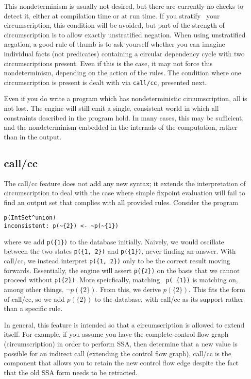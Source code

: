 This nondeterminism is usually not desired, but there are currently no checks to detect it, either at compilation time or at run time.
If you stratify~\cite{prologbook} your circumscription, this condition will be avoided, but part of the strength of circumscription is to allow exactly unstratified negation.
When using unstratified negation, a good rule of thumb is to ask yourself whether you can imagine individual facts (not predicates) containing a circular dependency cycle with two circumscriptions present.
Even if this is the case, it may not force this nondeterminism, depending on the action of the rules.
The condition where one circumscription is present is dealt with via \texttt{call/cc}, presented next.

Even if you do write a program which has nondeterministic circumscription, all is not lost.
The engine will still emit a single, consistent world in which all constraints described in the program hold.
In many cases, this may be sufficient, and the nondeterminism embedded in the internals of the computation, rather than in the output.

\subsection{call/cc}
\label{holmes:sec:callcc}
The call/cc feature does not add any new syntax; it extends the interpretation of circumscription to deal with the case where simple fixpoint evaluation will fail to find an output set that complies with all provided rules.
Consider the program
\begin{verbatim}
p(IntSet^union)
inconsistent: p(~{2}) <- ~p(~{1})
\end{verbatim}
where we add \texttt{p(\{1\})} to the database initially.
Naively, we would oscillate between the two states \texttt{p(\{1, 2\})} and \texttt{p(\{1\})}, never finding an answer.
With call/cc, we instead interpret \texttt{p(\{1, 2\})} only to be the correct result moving forwards.
Essentially, the engine will assert \texttt{p(\{2\})} on the basis that we cannot proceed without \texttt{p(\{2\})}.
More speicfically, matching \texttt{~p(~\{1\})} is matching on, among other things, $\neg p(\{2\})$.
From this, we derive $p(\{2\})$.
This fits the form of call/cc, so we add $p(\{2\})$ to the database, with call/cc as its support rather than a specific rule.

In general, this feature is intended so that a circumscription is allowed to extend itself.
For example, if you assume you have the complete control flow graph (circumscription) in order to perform SSA, then determine that a new value is possible for an indirect call (extending the control flow graph), call/cc is the component that allows you to retain the new control flow edge despite the fact that the old SSA form needs to be retracted.
